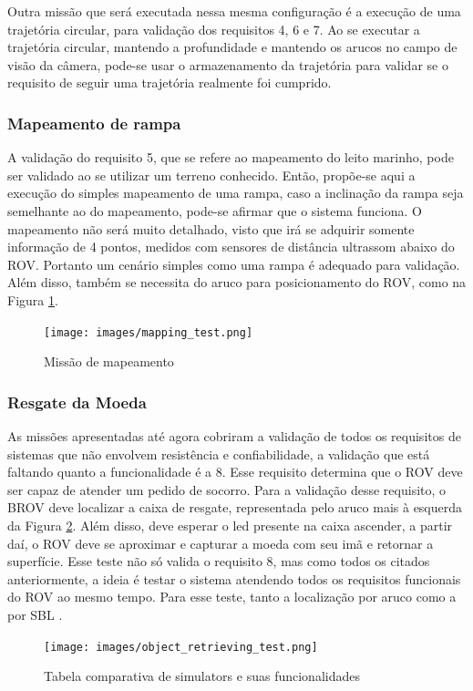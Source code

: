 Outra missão que será executada nessa mesma configuração é a execução de uma trajetória circular, para validação dos requisitos 4, 6 e 7. Ao se executar a trajetória circular, mantendo a profundidade e mantendo os arucos no campo de visão da câmera, pode-se usar o armazenamento da trajetória para validar se o requisito de seguir uma trajetória realmente foi cumprido.

\subsubsection{Mapeamento de rampa}

A validação do requisito 5, que se refere ao mapeamento do leito marinho, pode ser
validado ao se utilizar um terreno conhecido. Então, propõe-se aqui a execução do simples mapeamento de uma rampa, caso a inclinação da rampa seja semelhante ao do mapeamento, pode-se afirmar que o sistema funciona. O mapeamento não será muito detalhado, visto que irá se adquirir somente informação de 4 pontos, medidos com sensores de distância ultrassom abaixo do ROV. Portanto um cenário simples como uma rampa é adequado para validação. Além disso, também se necessita do aruco para posicionamento do ROV, como na Figura \ref{fig:mapping-test}.

\begin{figure}[h]
	\label{fig:mapping-test}
	\caption{Missão de mapeamento}
	\centering
	\texttt{[image: images/mapping\_test.png]}
\end{figure}

\subsubsection{Resgate da Moeda}
As missões apresentadas até agora cobriram a validação de todos os requisitos de sistemas que não envolvem resistência e confiabilidade, a validação que está faltando quanto a funcionalidade é a 8. Esse requisito determina que o ROV deve ser capaz de atender um pedido de socorro. Para a validação desse requisito, o BROV deve localizar a caixa de resgate, representada pelo aruco mais à esquerda da Figura \ref{fig:object-retrieving-test}. Além disso, deve esperar o led presente na caixa ascender, a partir daí, o ROV deve se aproximar e capturar a moeda com seu imã e retornar a superfície. Esse teste não só valida o requisito 8, mas como todos os citados anteriormente, a ideia é testar o sistema atendendo todos os requisitos funcionais do ROV ao mesmo tempo. Para esse teste, tanto a localização por aruco como a por SBL .

\begin{figure}[h]
	\label{fig:object-retrieving-test}
	\caption{Tabela comparativa de simulators e suas funcionalidades}
	\centering
	\texttt{[image: images/object\_retrieving\_test.png]}
\end{figure}



